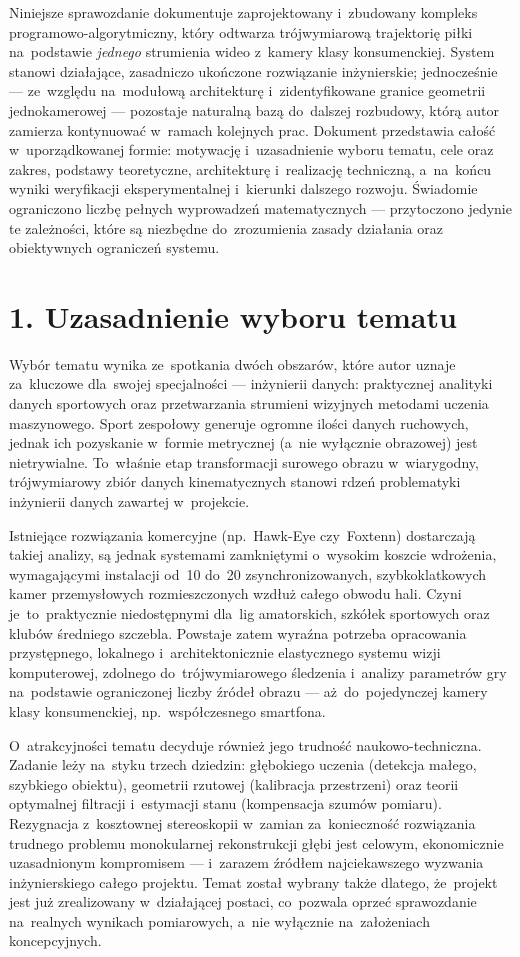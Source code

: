 \documentclass[14pt,a4paper]{extarticle}
\newcommand{\rozdzial}[1]{\clearpage\section*{#1}\addcontentsline{toc}{section}{#1}}
\begin{document}
Niniejsze sprawozdanie dokumentuje zaprojektowany i~zbudowany kompleks
programowo-algorytmiczny, który odtwarza trójwymiarową trajektorię piłki na~podstawie
\emph{jednego} strumienia wideo z~kamery klasy konsumenckiej. System stanowi działające,
zasadniczo ukończone rozwiązanie inżynierskie; jednocześnie --- ze~względu na~modułową
architekturę i~zidentyfikowane granice geometrii jednokamerowej --- pozostaje naturalną
bazą do~dalszej rozbudowy, którą autor zamierza kontynuować w~ramach kolejnych prac.
Dokument przedstawia całość w~uporządkowanej formie: motywację i~uzasadnienie wyboru
tematu, cele oraz zakres, podstawy teoretyczne, architekturę i~realizację techniczną,
a~na~końcu wyniki weryfikacji eksperymentalnej i~kierunki dalszego rozwoju. Świadomie
ograniczono liczbę pełnych wyprowadzeń matematycznych --- przytoczono jedynie te
zależności, które są niezbędne do~zrozumienia zasady działania oraz obiektywnych
ograniczeń systemu.

\rozdzial{1. Uzasadnienie wyboru tematu}
Wybór tematu wynika ze~spotkania dwóch obszarów, które autor uznaje za~kluczowe dla~swojej
specjalności --- inżynierii danych: praktycznej analityki danych sportowych oraz
przetwarzania strumieni wizyjnych metodami uczenia maszynowego. Sport zespołowy generuje
ogromne ilości danych ruchowych, jednak ich pozyskanie w~formie metrycznej (a~nie
wyłącznie obrazowej) jest nietrywialne. To~właśnie etap transformacji surowego obrazu
w~wiarygodny, trójwymiarowy zbiór danych kinematycznych stanowi rdzeń problematyki
inżynierii danych zawartej w~projekcie.

Istniejące rozwiązania komercyjne (np.~Hawk-Eye czy~Foxtenn) dostarczają takiej analizy,
są jednak systemami zamkniętymi o~wysokim koszcie wdrożenia, wymagającymi instalacji
od~10 do~20 zsynchronizowanych, szybkoklatkowych kamer przemysłowych rozmieszczonych
wzdłuż całego obwodu hali. Czyni je~to~praktycznie niedostępnymi dla~lig amatorskich,
szkółek sportowych oraz klubów średniego szczebla. Powstaje zatem wyraźna potrzeba
opracowania przystępnego, lokalnego i~architektonicznie elastycznego systemu wizji
komputerowej, zdolnego do~trójwymiarowego śledzenia i~analizy parametrów gry na~podstawie
ograniczonej liczby źródeł obrazu --- aż~do~pojedynczej kamery klasy konsumenckiej,
np.~współczesnego smartfona.

O~atrakcyjności tematu decyduje również jego trudność naukowo-techniczna. Zadanie leży
na~styku trzech dziedzin: głębokiego uczenia (detekcja małego, szybkiego obiektu),
geometrii rzutowej (kalibracja przestrzeni) oraz teorii optymalnej filtracji i~estymacji
stanu (kompensacja szumów pomiaru). Rezygnacja z~kosztownej stereoskopii w~zamian
za~konieczność rozwiązania trudnego problemu monokularnej rekonstrukcji głębi jest
celowym, ekonomicznie uzasadnionym kompromisem --- i~zarazem źródłem najciekawszego
wyzwania inżynierskiego całego projektu. Temat został wybrany także dlatego, że~projekt
jest już zrealizowany w~działającej postaci, co~pozwala oprzeć sprawozdanie na~realnych
wynikach pomiarowych, a~nie wyłącznie na~założeniach koncepcyjnych.
\end{document}
